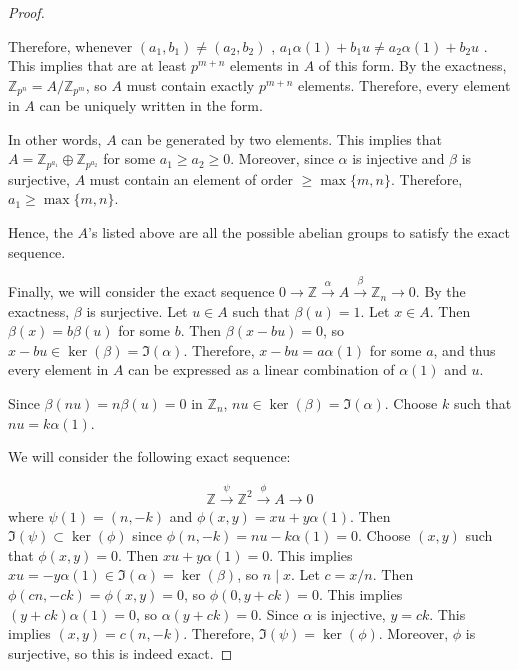\documentclass[12pt, psamsfonts]{amsart}
\theoremstyle{definition}
\theoremstyle{remark}
\numberwithin{equation}{section}
\begin{document}
\begin{proof}
\begin{itemize}
      Therefore, whenever $(a_1, b_1) \ne (a_2, b_2)$ , $a_1\alpha(1) + b_1u \ne a_2\alpha(1) + b_2u$ .
      This implies that are at least $p^{m + n}$ elements in $A$ of this form.
      By the exactness, $\mathbb{Z}_{p^n} = A / \mathbb{Z}_{p^m}$, so $A$ must contain exactly $p^{m + n}$ elements.
      Therefore, every element in $A$ can be uniquely written in the form.

      In other words, $A$ can be generated by two elements.
      This implies that $A = \mathbb{Z}_{p^{a_1}} \oplus \mathbb{Z}_{p^{a_2}}$ for some $a_1 \geq a_2 \geq 0$.
      Moreover, since $\alpha$ is injective and $\beta$ is surjective, $A$ must contain an element of order $\geq \max\{ m, n \}$.
      Therefore, $a_1 \geq \max\{ m, n \}$.
  \end{itemize}
  Hence, the $A$'s listed above are all the possible abelian groups to satisfy the exact sequence.

  Finally, we will consider the exact sequence $0 \rightarrow \mathbb{Z} \xrightarrow{\alpha} A \xrightarrow{\beta} \mathbb{Z}_n \rightarrow 0$.
  By the exactness, $\beta$ is surjective.
  Let $u \in A$ such that $\beta(u) = 1$.
  Let $x \in A$.
  Then $\beta(x) = b\beta(u)$ for some $b$.
  Then $\beta(x - bu) = 0$, so $x - bu \in \ker(\beta) = \Im(\alpha)$.
  Therefore, $x - bu = a\alpha(1)$ for some $a$, and thus every element in $A$ can be expressed as a linear combination of $\alpha(1)$ and $u$.

  Since $\beta(nu) = n\beta(u) = 0$ in $\mathbb{Z}_n$, $nu \in \ker(\beta) = \Im(\alpha)$.
  Choose $k$ such that $nu = k\alpha(1)$.

  We will consider the following exact sequence:

  \begin{align*}
    \mathbb{Z} \xrightarrow{\psi} \mathbb{Z}^2 \xrightarrow{\phi} A \rightarrow 0
  \end{align*}
  where $\psi(1) = (n, -k)$ and $\phi(x, y) = xu + y\alpha(1)$.
  Then $\Im(\psi) \subset \ker(\phi)$ since $\phi(n, -k) = nu - k\alpha(1) = 0$.
  Choose $(x, y)$ such that $\phi(x, y) = 0$.
  Then $xu + y\alpha(1) = 0$.
  This implies $xu = -y\alpha(1) \in \Im(\alpha) = \ker(\beta)$, so $n \mid x$.
  Let $c = x / n$.
  Then $\phi(cn, -ck) = \phi(x, y) = 0$, so $\phi(0, y + ck) = 0$.
  This implies $(y + ck)\alpha(1) = 0$, so $\alpha(y + ck) = 0$.
  Since $\alpha$ is injective, $y = ck$.
  This implies $(x, y) = c(n, -k)$.
  Therefore, $\Im(\psi) = \ker(\phi)$.
  Moreover, $\phi$ is surjective, so this is indeed exact.


\end{proof}
\end{document}
